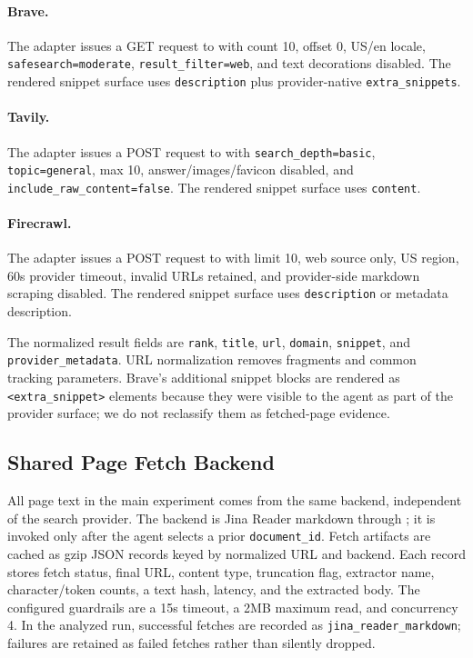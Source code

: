 \paragraph{Brave.}
The adapter issues a GET request to  with count 10, offset 0, US/en locale, \texttt{safesearch=moderate}, \texttt{result\_filter=web}, and text decorations disabled. The rendered snippet surface uses \texttt{description} plus provider-native \texttt{extra\_snippets}.

\paragraph{Tavily.}
The adapter issues a POST request to  with \texttt{search\_depth=basic}, \texttt{topic=general}, max 10, answer/images/favicon disabled, and \texttt{include\_raw\_content=false}. The rendered snippet surface uses \texttt{content}.

\paragraph{Firecrawl.}
The adapter issues a POST request to  with limit 10, web source only, US region, 60s provider timeout, invalid URLs retained, and provider-side markdown scraping disabled. The rendered snippet surface uses \texttt{description} or metadata description.

The normalized result fields are \texttt{rank}, \texttt{title}, \texttt{url}, \texttt{domain}, \texttt{snippet}, and \texttt{provider\_metadata}. URL normalization removes fragments and common tracking parameters. Brave's additional snippet blocks are rendered as \texttt{<extra\_snippet>} elements because they were visible to the agent as part of the provider surface; we do not reclassify them as fetched-page evidence.

\subsection{Shared Page Fetch Backend}
\label{app:fetch}
All page text in the main experiment comes from the same \fetchPage{} backend, independent of the search provider. The backend is Jina Reader markdown through ; it is invoked only after the agent selects a prior \texttt{document\_id}. Fetch artifacts are cached as gzip JSON records keyed by normalized URL and backend. Each record stores fetch status, final URL, content type, truncation flag, extractor name, character/token counts, a text hash, latency, and the extracted body. The configured guardrails are a 15s timeout, a 2MB maximum read, and concurrency 4. In the analyzed run, successful fetches are recorded as \texttt{jina\_reader\_markdown}; failures are retained as failed fetches rather than silently dropped.

